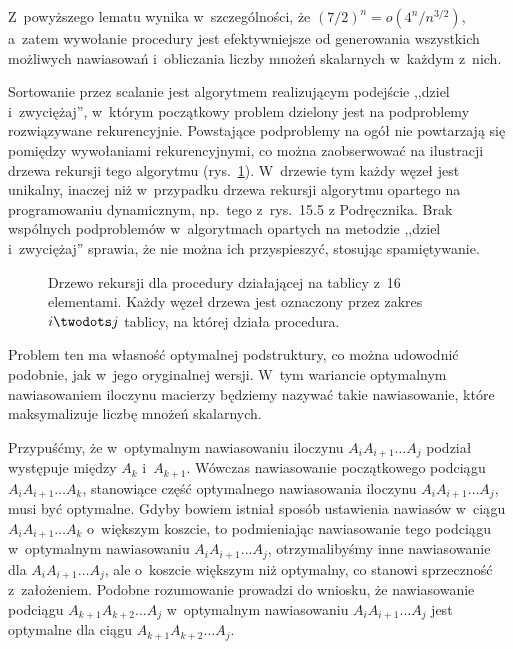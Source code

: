 Z~powyższego lematu wynika w~szczególności, że $(7/2)^n=o(4^n\!/n^{3/2})$, a~zatem wywołanie procedury  jest efektywniejsze od generowania wszystkich możliwych nawiasowań i~obliczania liczby mnożeń skalarnych w~każdym z~nich.

\exercise %
Sortowanie przez scalanie jest algorytmem realizującym podejście ,,dziel i~zwyciężaj'', w~którym początkowy problem dzielony jest na podproblemy rozwiązywane rekurencyjnie.
Powstające podproblemy na ogół nie powtarzają się pomiędzy wywołaniami rekurencyjnymi, co można zaobserwować na ilustracji drzewa rekursji tego algorytmu (rys.\ \ref{fig:15.3-2}).
W~drzewie tym każdy węzeł jest unikalny, inaczej niż w~przypadku drzewa rekursji algorytmu opartego na programowaniu dynamicznym, np.\ tego z~rys.\ 15.5 z Podręcznika.
Brak wspólnych podproblemów w~algorytmach opartych na metodzie ,,dziel i~zwyciężaj'' sprawia, że nie można ich przyspieszyć, stosując spamiętywanie.
\begin{figure}[!ht]
	\centering 
	\caption{Drzewo rekursji dla procedury  działającej na tablicy z~16 elementami.
Każdy węzeł drzewa jest oznaczony przez zakres $i\twodots j$ tablicy, na której działa procedura.} \label{fig:15.3-2}
\end{figure}

\exercise %
Problem ten ma własność optymalnej podstruktury, co można udowodnić podobnie, jak w~jego oryginalnej wersji.
W~tym wariancie optymalnym nawiasowaniem iloczynu macierzy będziemy nazywać takie nawiasowanie, które maksymalizuje liczbę mnożeń skalarnych.

Przypuśćmy, że w~optymalnym nawiasowaniu iloczynu $A_iA_{i+1}\dots A_j$ podział występuje między $A_k$ i~$A_{k+1}$.
Wówczas nawiasowanie początkowego podciągu $A_iA_{i+1}\dots A_k$, stanowiące część optymalnego nawiasowania iloczynu $A_iA_{i+1}\dots A_j$, musi być optymalne.
Gdyby bowiem istniał sposób ustawienia nawiasów w~ciągu $A_iA_{i+1}\dots A_k$ o~większym koszcie, to podmieniając nawiasowanie tego podciągu w~optymalnym nawiasowaniu $A_iA_{i+1}\dots A_j$, otrzymalibyśmy inne nawiasowanie dla $A_iA_{i+1}\dots A_j$, ale o~koszcie większym niż optymalny, co stanowi sprzeczność z~założeniem.
Podobne rozumowanie prowadzi do wniosku, że nawiasowanie podciągu $A_{k+1}A_{k+2}\dots A_j$ w~optymalnym nawiasowaniu $A_iA_{i+1}\dots A_j$ jest optymalne dla ciągu $A_{k+1}A_{k+2}\dots A_j$.

\exercise %
\exercise %
